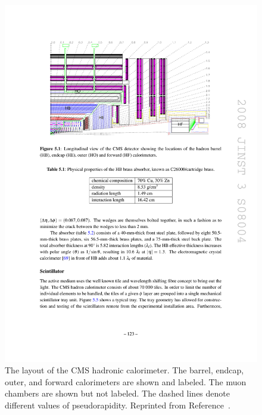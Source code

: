 \begin{figure}[htbp]
  \centering
  \includegraphics[width=\textwidth]{Detector/Figures/cms_hcal.pdf}
  \caption{
    The layout of the CMS hadronic calorimeter.
    The barrel, endcap, outer, and forward calorimeters are shown and labeled.
    The muon chambers are shown but not labeled. 
    The dashed lines denote different values of pseudorapidity.
    Reprinted from Reference~\cite{}. %
  }
  \label{fig:cms_hcal}
\end{figure}

